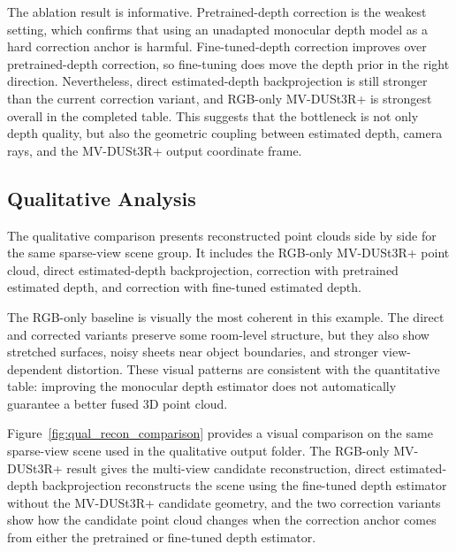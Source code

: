 \documentclass[12pt,a4paper]{article}
\newcommand{\mvdp}{MV-DUSt3R+}
\begin{document}
The ablation result is informative. Pretrained-depth correction is the weakest setting, which confirms that using an unadapted monocular depth model as a hard correction anchor is harmful. Fine-tuned-depth correction improves over pretrained-depth correction, so fine-tuning does move the depth prior in the right direction. Nevertheless, direct estimated-depth backprojection is still stronger than the current correction variant, and RGB-only \mvdp{} is strongest overall in the completed table. This suggests that the bottleneck is not only depth quality, but also the geometric coupling between estimated depth, camera rays, and the \mvdp{} output coordinate frame.

\subsection{Qualitative Analysis}
The qualitative comparison presents reconstructed point clouds side by side for the same sparse-view scene group. It includes the RGB-only \mvdp{} point cloud, direct estimated-depth backprojection, correction with pretrained estimated depth, and correction with fine-tuned estimated depth.

The RGB-only baseline is visually the most coherent in this example. The direct and corrected variants preserve some room-level structure, but they also show stretched surfaces, noisy sheets near object boundaries, and stronger view-dependent distortion. These visual patterns are consistent with the quantitative table: improving the monocular depth estimator does not automatically guarantee a better fused 3D point cloud.

Figure~\ref{fig:qual_recon_comparison} provides a visual comparison on the same sparse-view scene used in the qualitative output folder. The RGB-only \mvdp{} result gives the multi-view candidate reconstruction, direct estimated-depth backprojection reconstructs the scene using the fine-tuned depth estimator without the \mvdp{} candidate geometry, and the two correction variants show how the candidate point cloud changes when the correction anchor comes from either the pretrained or fine-tuned depth estimator.
\end{document}
